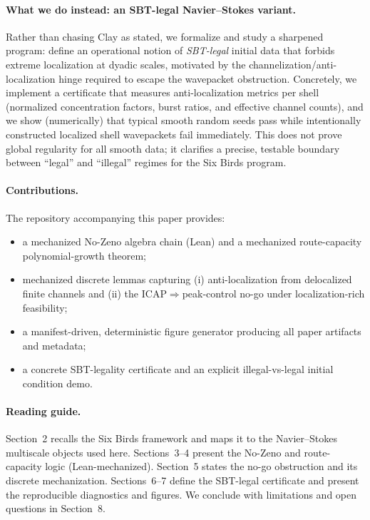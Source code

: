 \documentclass[11pt]{article}
\begin{document}
\paragraph{What we do instead: an SBT-legal Navier--Stokes variant.}
Rather than chasing Clay as stated, we formalize and study a sharpened program: define an operational notion of \emph{SBT-legal} initial data that forbids extreme localization at dyadic scales, motivated by the channelization/anti-localization hinge required to escape the wavepacket obstruction. Concretely, we implement a certificate that measures anti-localization metrics per shell (normalized concentration factors, burst ratios, and effective channel counts), and we show (numerically) that typical smooth random seeds pass while intentionally constructed localized shell wavepackets fail immediately. This does not prove global regularity for all smooth data; it clarifies a precise, testable boundary between ``legal'' and ``illegal'' regimes for the Six Birds program.

\paragraph{Contributions.}
The repository accompanying this paper provides:
\begin{itemize}
\item a mechanized No-Zeno algebra chain (Lean) and a mechanized route-capacity polynomial-growth theorem;
\item mechanized discrete lemmas capturing (i) anti-localization from delocalized finite channels and (ii) the ICAP$\Rightarrow$peak-control no-go under localization-rich feasibility;
\item a manifest-driven, deterministic figure generator producing all paper artifacts and metadata;
\item a concrete SBT-legality certificate and an explicit illegal-vs-legal initial condition demo.
\end{itemize}

\paragraph{Reading guide.}
Section~2 recalls the Six Birds framework and maps it to the Navier--Stokes multiscale objects used here. Sections~3--4 present the No-Zeno and route-capacity logic (Lean-mechanized). Section~5 states the no-go obstruction and its discrete mechanization. Sections~6--7 define the SBT-legal certificate and present the reproducible diagnostics and figures. We conclude with limitations and open questions in Section~8.
\end{document}
